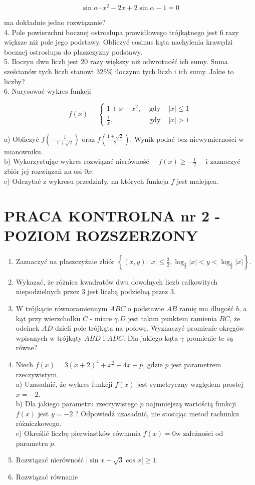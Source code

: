 \documentclass[10pt]{article}
\begin{document}
$$
\sin \alpha \cdot x^{2}-2 x+2 \sin \alpha-1=0
$$

ma dokładnie jedno rozwiązanie?\\
4. Pole powierzchni bocznej ostrosłupa prawidłowego trójkątnego jest 6 razy większe niż pole jego podstawy. Obliczyć cosinus kąta nachylenia krawędzi bocznej ostrosłupa do płaszczyzny podstawy.\\
5. Iloczyn dwu liczb jest 20 razy większy niż odwrotność ich sumy. Suma sześcianów tych liczb stanowi $325 \%$ iloczynu tych liczb i ich sumy. Jakie to liczby?\\
6. Narysować wykres funkcji

$$
f(x)=\left\{\begin{array}{lll}
1+x-x^{2}, & \text { gdy } & |x| \leqslant 1 \\
\frac{1}{x}, & \text { gdy } & |x|>1
\end{array}\right.
$$

a) Obliczyć $f\left(-\frac{1}{1+\sqrt{2}}\right)$ oraz $f\left(\frac{1+\sqrt{2}}{2}\right)$. Wynik podać bez niewymierności w mianowniku.\\
b) Wykorzystując wykres rozwiązać nierówność $\quad f(x) \geqslant-\frac{1}{2} \quad$ i zaznaczyć zbiór jej rozwiązań na osi $0 x$.\\
c) Odczytać z wykresu przedziały, na których funkcja $f$ jest malejąca.

\section*{PRACA KONTROLNA nr 2 - POZIOM ROZSZERZONY}
\begin{enumerate}
  \item Zaznaczyć na płaszczyźnie zbiór $\left\{(x, y):|x| \leqslant \frac{3}{2}, \log _{\frac{2}{3}}|x|<y<\log _{\frac{3}{2}}|x|\right\}$.
  \item Wykazać, że różnica kwadratów dwu dowolnych liczb całkowitych niepodzielnych przez 3 jest liczbą podzielną przez 3.
  \item W trójkącie równoramiennym $A B C$ o podstawie $A B$ ramię ma długość $b$, a kąt przy wierzchołku $C$ - miare $\gamma . D$ jest takim punktem ramienia $B C$, że odcinek $A D$ dzieli pole trójkąta na połowę. Wyznaczyć promienie okręgów wpisanych w trójkąty $A B D$ i $A D C$. Dla jakiego kąta $\gamma$ promienie te są równe?
  \item Niech $f(x)=3(x+2)^{4}+x^{2}+4 x+p$, gdzie $p$ jest parametrem rzeczywistym.\\
a) Uzasadnić, że wykres funkcji $f(x)$ jest symetryczny względem prostej $x=-2$.\\
b) Dla jakiego parametru rzeczywistego $p$ najmniejszą wartością funkcji $f(x)$ jest $y=-2$ ? Odpowiedź uzasadnić, nie stosując metod rachunku różniczkowego.\\
c) Określić liczbę pierwiastków równania $f(x)=0 \mathrm{w}$ zależności od parametru $p$.
  \item Rozwiązać nierówność $|\sin x-\sqrt{3} \cos x| \geqslant 1$.
  \item Rozwiązać równanie
\end{enumerate}
\end{document}
